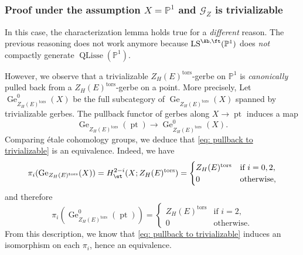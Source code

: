 \documentclass[10pt]{amsart}
\newcommand{\sssec}{\subsubsection}
\theoremstyle{remark}
\newcommand{\te}{\text}
\newcommand{\pjl}{\mathbb{P}^1}
\newcommand{\on}{\operatorname}
\newcommand{\cG}{\mathcal{G}}
\newcommand{\LS}{\on{LS}}
\newcommand{\QLisse}{\on{QLisse}}
\newcommand{\pt}{\on{pt}}
\begin{document}
        \sssec{Proof under the assumption $X=\pjl$ and $\cG_Z$ is trivializable}\label{sssec: X=pjl and trivializable}
        In this case, the characterization lemma holds true for a \emph{different} reason. The previous reasoning does not work anymore because $\LS^{\Ab,\ft}(\pjl)$ does \emph{not} compactly generate $\QLisse(\pjl)$.
        \medskip

        However, we observe that a trivializable $Z_H(E)^{\on{tors}}$-gerbe on $\pjl$ is \emph{canonically} pulled back from a $Z_H(E)^{\on{tors}}$-gerbe on a point. More precisely, Let $\on{Ge}^{0}_{Z_H(E)^{\on{tors}}}(X)$ be the full subcategory of $\on{Ge}_{Z_H(E)^{\on{tors}}}(X)$ spanned by trivializable gerbes. The pullback functor of gerbes along $X\rightarrow \pt$
induces a map
\begin{equation}\label{eq: pullback to trivializable}
    \on{Ge}_{Z_H(E)^{\on{tors}}}(\pt)\rightarrow \on{Ge}^0_{Z_H(E)^{\on{tors}}}(X). \end{equation}
Comparing \'etale cohomology groups, we deduce that \eqref{eq: pullback to trivializable} is an equivalence. Indeed, we have
\[\pi_i(\on{Ge}_{Z_H(E)^{\on{tors}}}(X))=H^{2-i}_{\et}(X; Z_H(E)^{\on{tors}})=\begin{cases} Z_H(E)^{\on{tors}} & \te{if } i=0,2,\\
0 & \te{otherwise,}
\end{cases}\]
and therefore
\[\pi_i(\on{Ge}^0_{Z_H(E)^{\on{tors}}}(\pt))=\begin{cases} Z_H(E)^{\on{tors}} & \te{if } i=2,\\
0 & \te{otherwise.}
\end{cases}\]
From this description, we know that \eqref{eq: pullback to trivializable} induces an isomorphism on each $\pi_i$, hence an equivalence.
\medskip
\end{document}
